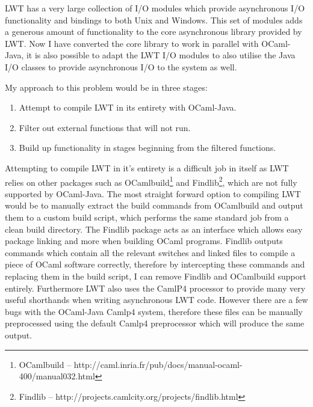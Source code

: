 \documentclass[12pt,twoside,notitlepage]{report}
\begin{document}
%
%

%
%

%
%
LWT has a very large collection of I/O modules which provide asynchronous I/O functionality and bindings to both Unix and Windows. This set of modules adds a generous amount of functionality to the core asynchronous library
provided by LWT. Now I have converted the core library to work in parallel with OCaml-Java, it is also possible to adapt the LWT I/O modules to also utilise the Java I/O classes to provide asynchronous I/O to the system as
well. 

My approach to this problem would be in three stages:

\begin{enumerate}
\item Attempt to compile LWT in its entirety with OCaml-Java.
\item Filter out external functions that will not run.
\item Build up functionality in stages beginning from the filtered functions.
\end{enumerate}

Attempting to compile LWT in it's entirety is a difficult job in itself as LWT relies on other packages such as OCamlbuild\footnote{OCamlbuild -- http://caml.inria.fr/pub/docs/manual-ocaml-400/manual032.html} and
Findlib\footnote{Findlib -- http://projects.camlcity.org/projects/findlib.html}, which are not fully supported by OCaml-Java. The most straight forward option to compiling LWT would be to manually extract the build
commands from OCamlbuild and output them to a custom build script, which performs the same standard job from a clean build directory. The Findlib package acts as an interface which allows easy package linking and more when building
OCaml programs. Findlib outputs commands which contain all the relevant switches and linked files to compile a piece of OCaml software correctly, therefore by intercepting these commands and replacing them in the build script, I
can remove Findlib and OCamlbuild support entirely. Furthermore LWT also uses the CamlP4 processor to provide many very useful shorthands when writing asynchronous LWT code. However there are a few bugs with the OCaml-Java Camlp4
system, therefore these files can be manually preprocessed using the default Camlp4 preprocessor which will produce the same output.
\end{document}
